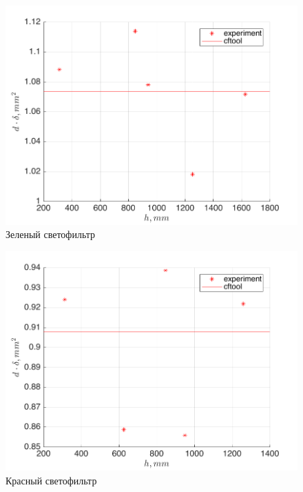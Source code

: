 \begin{figure}[ht]

\includegraphics[width=\textwidth]{data/dd_g.png}
\caption{Зеленый светофильтр}
\label{fig:dd_g}
\end{figure}
\begin{figure}[]
	\centering
\includegraphics[width=\textwidth]{data/dd_r.png}
\caption{Красный светофильтр}
\label{fig:dd_r}
\end{figure}

